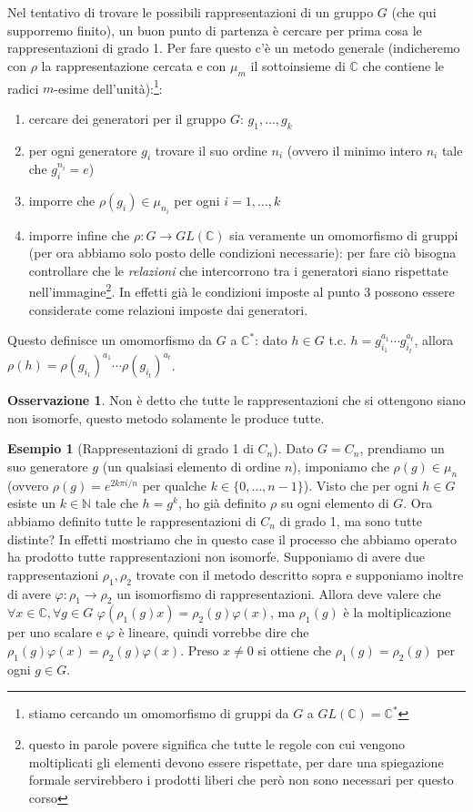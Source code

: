 \documentclass[11pt]{article}
\theoremstyle{plain}
\theoremstyle{definition}
\newtheorem{exmp}{Esempio}[section]
\newtheorem*{rem}{Osservazione}
\theoremstyle{remark}
\newcommand{\C}{\mathbb{C}}
\newcommand{\N}{\mathbb{N}}
\begin{document}
Nel tentativo di trovare le possibili rappresentazioni di un gruppo $G$ (che qui supporremo finito), un buon punto di partenza è cercare per prima cosa le rappresentazioni di grado 1. Per fare questo c'è un metodo generale (indicheremo con $\rho$ la rappresentazione cercata e con $\mu_m$ il sottoinsieme di $\C$ che contiene le radici $m$-esime dell'unità):\footnote{stiamo cercando un omomorfismo di gruppi da $G$ a $GL(\C)=\C^*$}:
\begin{enumerate}
	\item cercare dei generatori per il gruppo $G$: $g_1, \ldots, g_k$
	\item per ogni generatore $g_i$ trovare il suo ordine $n_i$ (ovvero il minimo intero $n_i$ tale che $g_i^{n_i}=e$)
	\item imporre che $\rho(g_i)\in \mu_{n_i}$ per ogni $i=1,\ldots,k$
	\item imporre infine che $\rho:G\to GL(\C)$ sia veramente un omomorfismo di gruppi (per ora abbiamo solo posto delle condizioni necessarie):
	 per fare ciò bisogna controllare che le \textit{relazioni} che intercorrono tra i generatori siano rispettate nell'immagine\footnote{questo in parole povere significa che tutte le regole con cui vengono moltiplicati gli elementi devono essere rispettate, per dare una spiegazione formale servirebbero i prodotti liberi che però non sono necessari per questo corso}.
	 In effetti già le condizioni imposte al punto 3 possono essere considerate come relazioni imposte dai generatori.
\end{enumerate}
Questo definisce un omomorfismo da $G$ a $\C^*$: dato $h\in G$ t.c. $h=g_{i_1}^{a_1}\cdots g_{i_t}^{a_t}$, allora $\rho(h) = \rho(g_{i_1})^{a_1}\cdots \rho(g_{i_t})^{a_t}$.
\begin{rem}
	Non è detto che tutte le rappresentazioni che si ottengono siano non isomorfe, questo metodo solamente le produce tutte.
\end{rem}


\begin{exmp}[Rappresentazioni di grado 1 di $C_n$]
Dato $G=C_n$, prendiamo un suo generatore $g$ (un qualsiasi elemento di ordine $n$), imponiamo che $\rho(g)\in \mu_n$ (ovvero $\rho(g)=e^{2k\pi i/n}$ per qualche $k\in \{0,\ldots,n-1\}$).
Visto che per ogni $h\in G$ esiste un $k\in \N$ tale che $h=g^k$, ho già definito $\rho$ su ogni elemento di $G$.
Ora abbiamo definito tutte le rappresentazioni di $C_n$ di grado 1, ma sono tutte distinte?
In effetti mostriamo che in questo case il processo che abbiamo operato ha prodotto tutte rappresentazioni non isomorfe.
Supponiamo di avere due rappresentazioni $\rho_1, \rho_2$ trovate con il metodo descritto sopra e supponiamo inoltre di avere 
$\varphi:\rho_1\to\rho_2$ un isomorfismo di rappresentazioni.
Allora deve valere che $\forall x\in \C, \forall g\in G$ $\varphi( \rho_1(g)x ) = \rho_2(g)\varphi(x)$,
ma $\rho_1(g)$ è la moltiplicazione per uno scalare e $\varphi$ è lineare, quindi vorrebbe dire che 
$\rho_1(g)\varphi( x ) = \rho_2(g) \varphi(x)$. Preso $x\neq 0$ si ottiene che $\rho_1(g)=\rho_2(g)$ per ogni $g\in G$.
\end{exmp}
\end{document}
